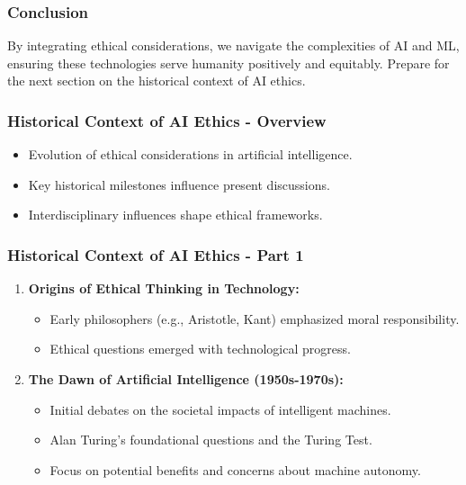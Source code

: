 \documentclass[aspectratio=169]{beamer}
\begin{document}
\begin{frame}[fragile]
    \frametitle{Conclusion}
    By integrating ethical considerations, we navigate the complexities of AI and ML, ensuring these technologies serve humanity positively and equitably. 
    Prepare for the next section on the historical context of AI ethics.
\end{frame}

\begin{frame}[fragile]
    \frametitle{Historical Context of AI Ethics - Overview}
    \begin{itemize}
        \item Evolution of ethical considerations in artificial intelligence.
        \item Key historical milestones influence present discussions.
        \item Interdisciplinary influences shape ethical frameworks.
    \end{itemize}
\end{frame}

\begin{frame}[fragile]
    \frametitle{Historical Context of AI Ethics - Part 1}
    \begin{enumerate}
        \item \textbf{Origins of Ethical Thinking in Technology:}
            \begin{itemize}
                \item Early philosophers (e.g., Aristotle, Kant) emphasized moral responsibility.
                \item Ethical questions emerged with technological progress.
            \end{itemize}
        \item \textbf{The Dawn of Artificial Intelligence (1950s-1970s):}
            \begin{itemize}
                \item Initial debates on the societal impacts of intelligent machines.
                \item Alan Turing's foundational questions and the Turing Test.
                \item Focus on potential benefits and concerns about machine autonomy.
            \end{itemize}
    \end{enumerate}
\end{frame}
\end{document}
